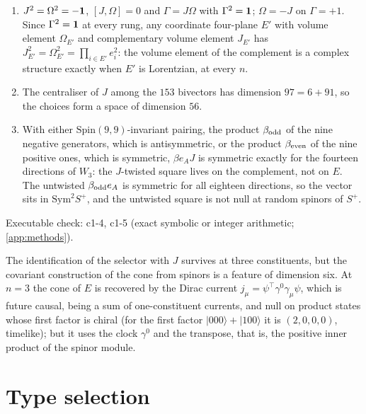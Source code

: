 \begin{theorem}
\label{thm:selector3}
\begin{enumerate}[label=(\roman*),leftmargin=2.2em]
\item $J^2=\Omega^2=-\mathbf 1$, $[J,\Omega]=0$ and $\Gamma=J\Omega$ with $\Gamma^2=\mathbf 1$; $\Omega=-J$ on $\Gamma=+1$. Since $\Gamma^2=\mathbf 1$ at every rung, any coordinate four-plane $E'$
with volume element $\Omega_{E'}$ and complementary volume element $J_{E'}$ has $J_{E'}^2=\Omega_{E'}^2=\prod_{i\in E'}e_i^2$: the volume element of the complement is a complex
structure exactly when $E'$ is Lorentzian, at every $n$.
\item The centraliser of $J$ among the $153$ bivectors has dimension $97=6+91$, so the choices form a space of dimension $56$.
\item With either $\mathrm{Spin}(9,9)$-invariant pairing, the product $\beta_{\rm odd}$ of the nine negative generators, which is antisymmetric, or the product $\beta_{\rm even}$
of the nine positive ones, which is symmetric, $\beta e_AJ$ is symmetric exactly for the fourteen directions of $W_3$: the $J$-twisted square lives on the complement,
not on $E$. The untwisted $\beta_{\rm odd}e_A$ is symmetric for all eighteen directions, so the vector sits in $\mathrm{Sym}^2S^+$, and the untwisted
square is not null at random spinors of $S^+$.
\end{enumerate}
\end{theorem}

\noindent Executable check: c1-4, c1-5 (exact symbolic or integer arithmetic; \cref{app:methods}).

The identification of the selector with $J$ survives at three constituents, but the covariant construction of the cone from spinors is a feature of dimension six. At
$n=3$ the cone of $E$ is recovered by the Dirac current $j_\mu=\psi^{\!\top}\gamma^0\gamma_\mu\psi$, which is future causal, being a sum of one-constituent currents, and
null on product states whose first factor is chiral (for the first factor $|000\rangle+|100\rangle$ it is $(2,0,0,0)$, timelike); but it uses the clock $\gamma^0$ and the transpose, that is, the positive inner product of the spinor module.



\section{Type selection}
\label{sec:typesel}

